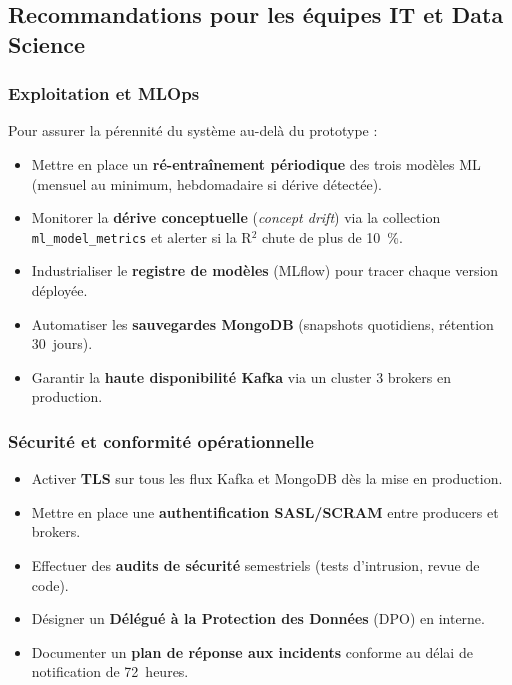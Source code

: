 \documentclass[11pt,a4paper]{article}
\begin{document}
\subsection{Recommandations pour les équipes IT et Data Science}

\subsubsection{Exploitation et MLOps}
Pour assurer la pérennité du système au-delà du prototype :
\begin{itemize}
  \item Mettre en place un \textbf{ré-entraînement périodique} des trois modèles ML (mensuel au minimum, hebdomadaire si dérive détectée).
  \item Monitorer la \textbf{dérive conceptuelle} (\emph{concept drift}) via la collection \texttt{ml\_model\_metrics} et alerter si la R$^2$ chute de plus de 10~\%.
  \item Industrialiser le \textbf{registre de modèles} (MLflow) pour tracer chaque version déployée.
  \item Automatiser les \textbf{sauvegardes MongoDB} (snapshots quotidiens, rétention 30~jours).
  \item Garantir la \textbf{haute disponibilité Kafka} via un cluster 3 brokers en production.
\end{itemize}

\subsubsection{Sécurité et conformité opérationnelle}
\begin{itemize}
  \item Activer \textbf{TLS} sur tous les flux Kafka et MongoDB dès la mise en production.
  \item Mettre en place une \textbf{authentification SASL/SCRAM} entre producers et brokers.
  \item Effectuer des \textbf{audits de sécurité} semestriels (tests d'intrusion, revue de code).
  \item Désigner un \textbf{Délégué à la Protection des Données} (DPO) en interne.
  \item Documenter un \textbf{plan de réponse aux incidents} conforme au délai de notification de 72~heures.
\end{itemize}
\end{document}
